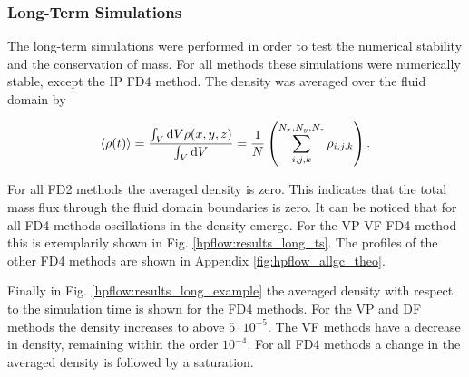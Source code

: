 \subsubsection{Long-Term Simulations}

The long-term simulations were performed in order to test the numerical stability and the conservation of mass.
For all methods these simulations were numerically stable, except the IP FD4 method.
The density was averaged over the fluid domain by

\begin{align}
    \label{vali:density_calc}
    \left<\rho(t)\right> = \frac{\int_V \mathop{}\!\mathrm{d} V \rho(x,y,z)}{\int_V \mathop{}\!\mathrm{d} V} =
    \frac{1}{N}\left(\sum_{i,j,k}^{N_x, N_y, N_z} \rho_{i,j,k}\right).
\end{align}


For all FD2 methods the averaged density is zero. This indicates that the total mass flux through the
fluid domain boundaries is zero.
It can be noticed that for all FD4 methods oscillations in the density emerge.
For the VP-VF-FD4 method this is exemplarily shown in Fig.  \ref{hpflow:results_long_ts}.
The profiles of the other FD4 methods are shown in Appendix \ref{fig:hpflow_allgc_theo}.

Finally in Fig. \ref{hpflow:results_long_example} the averaged density with respect to the simulation time is shown for the
FD4 methods.  For the VP and DF methods the density increases to above $5\cdot10^{-5}$.
The VF methods have a decrease in density, remaining within the order $10^{-4}$.
For all FD4 methods a change in the averaged density is followed by a saturation.

